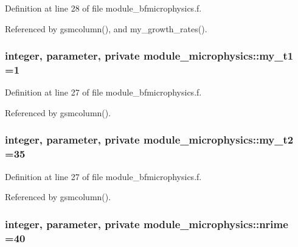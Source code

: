 Definition at line 28 of file module\+\_\+bfmicrophysics.\+f.



Referenced by gsmcolumn(), and my\+\_\+growth\+\_\+rates().

\subsubsection[{\texorpdfstring{my\+\_\+t1}{my_t1}}]{\setlength{\rightskip}{0pt plus 5cm}integer, parameter, private module\+\_\+microphysics\+::my\+\_\+t1 =1\hspace{0.3cm}{\ttfamily [private]}}\hypertarget{namespacemodule__microphysics_aae73524f22f4bc2373aaa5d8a6f7e7d6}{}\label{namespacemodule__microphysics_aae73524f22f4bc2373aaa5d8a6f7e7d6}


Definition at line 27 of file module\+\_\+bfmicrophysics.\+f.



Referenced by gsmcolumn().

\subsubsection[{\texorpdfstring{my\+\_\+t2}{my_t2}}]{\setlength{\rightskip}{0pt plus 5cm}integer, parameter, private module\+\_\+microphysics\+::my\+\_\+t2 =35\hspace{0.3cm}{\ttfamily [private]}}\hypertarget{namespacemodule__microphysics_a01af6bac32c88fd12ba020f66ad0ae80}{}\label{namespacemodule__microphysics_a01af6bac32c88fd12ba020f66ad0ae80}


Definition at line 27 of file module\+\_\+bfmicrophysics.\+f.



Referenced by gsmcolumn().

\subsubsection[{\texorpdfstring{nrime}{nrime}}]{\setlength{\rightskip}{0pt plus 5cm}integer, parameter, private module\+\_\+microphysics\+::nrime =40\hspace{0.3cm}{\ttfamily [private]}}\hypertarget{namespacemodule__microphysics_aaea427462ab04c90a0e8188c08e102c2}{}\label{namespacemodule__microphysics_aaea427462ab04c90a0e8188c08e102c2}


